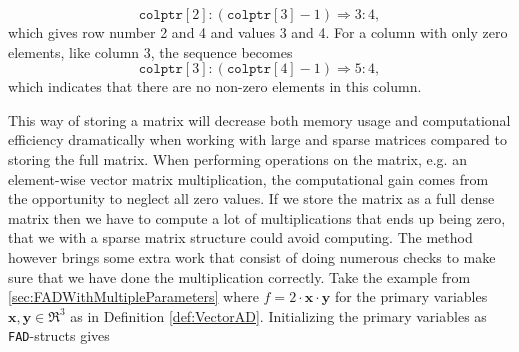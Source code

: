 \begin{equation*}
    \texttt{colptr}[2]:(\texttt{colptr}[3]-1) \Longrightarrow 3:4,
\end{equation*}
which gives row number 2 and 4 and values 3 and 4. For a column with only zero elements, like column 3, the sequence becomes
\begin{equation*}
    \texttt{colptr}[3]:(\texttt{colptr}[4]-1)\Longrightarrow 5:4,
\end{equation*}
which indicates that there are no non-zero elements in this column. 

This way of storing a matrix will decrease both memory usage and computational efficiency dramatically when working with large and sparse matrices compared to storing the full matrix. When performing operations on the matrix, e.g. an element-wise vector matrix  multiplication, the computational gain comes from the opportunity to neglect all zero values. If we store the matrix as a full dense matrix then we have to compute a lot of multiplications that ends up being zero, that we with a sparse matrix structure could avoid computing. The method however brings some extra work that consist of doing numerous checks to make sure that we have done the multiplication correctly. Take the example from \autoref{sec:FADWithMultipleParameters} where $f = 2\cdot \textbf{x}\cdot \textbf{y}$ for the primary variables $\textbf{x},\textbf{y}\in \Re^3$ as in Definition \eqref{def:VectorAD}. Initializing the primary variables as \texttt{FAD}-structs gives 
